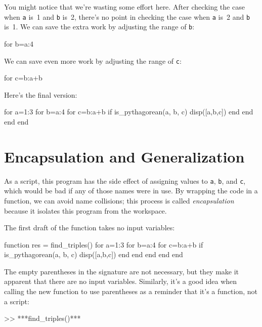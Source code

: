 You might notice that we're wasting some effort here.
After checking the case when \lstinline{a} is~1 and \lstinline{b} is~2, there's no point in checking
the case when \lstinline{a} is~2 and \lstinline{b} is~1.  We can save the extra work by adjusting the
range of \lstinline{b}:

\begin{code}
for b=a:4
\end{code}

We can save even more work by adjusting the range of \lstinline{c}:

\begin{code}
for c=b:a+b
\end{code}

Here's the final version:

\begin{code}
for a=1:3
    for b=a:4
        for c=b:a+b
            if is_pythagorean(a, b, c)
                disp([a,b,c])
            end
        end
    end
end
\end{code}

\section{Encapsulation and Generalization}

As a script, this program has the side effect of assigning values to
\lstinline{a}, \lstinline{b}, and \lstinline{c}, which would be bad if any of those names were in use.  
By wrapping the code in a function, we can avoid name collisions; this process is called \emph{encapsulation} because it isolates this program from the workspace.


The first draft of the function takes no input variables:

\begin{code}
function res = find_triples()
    for a=1:3
        for b=a:4
            for c=b:a+b
                if is_pythagorean(a, b, c)
                    disp([a,b,c])
                end
            end
        end
    end
end
\end{code}

The empty parentheses in the signature are not necessary, but
they make it apparent that there are no input variables.  Similarly,
it's a good idea when calling the new function to use parentheses as a reminder
that it's a function, not a script:

\begin{code}
>> ***find_triples()***
\end{code}

